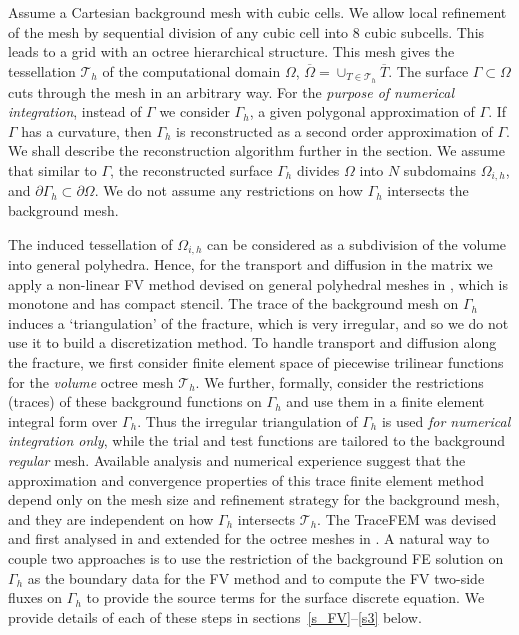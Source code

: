 \documentclass{article}
\newcommand{\rev}[1]{\textcolor{black}{{#1}}}
\newcommand{\T}{\mathcal T}
\def\dO{{\partial\Omega} }
\def\dG{{\partial\Gamma} }
\begin{document}
Assume a Cartesian background mesh with cubic cells. We allow local refinement of the mesh by sequential division
of any cubic cell into 8 cubic subcells. This leads to a grid with an octree hierarchical  structure. This mesh gives the tessellation   $\T_h$ of the computational domain $\Omega$, $\overline{\Omega}=\cup_{T\in\T_h} \overline{T}$.
The surface  $\Gamma\subset\Omega$ cuts through the mesh in an arbitrary way. For the \textit{purpose of numerical integration},
instead of $\Gamma$ we consider $\Gamma_h$, a given polygonal approximation of $\Gamma$. If $\Gamma$ has a curvature, then $\Gamma_h$ is reconstructed as a second order approximation of $\Gamma$. We shall describe the reconstruction algorithm further in the section. We assume that similar to $\Gamma$, the reconstructed surface $\Gamma_h$ divides $\Omega$ into $N$ subdomains $\Omega_{i,h}$, and $\dG_h\subset\dO$. We do not {assume} any restrictions on how $\Gamma_h$ intersects the background mesh.

The induced tessellation of  $\Omega_{i,h}$ can be considered as a subdivision of the volume into general polyhedra.
Hence, for the transport and diffusion in the matrix we apply  a non-linear FV method devised on general polyhedral meshes in \cite{Lipnikov:12,ChernyshenkoFV7:14}, which is monotone and has compact stencil. The trace of the background mesh on $\Gamma_h$ induces {a} `triangulation' of the fracture, which is very irregular, and so we do not use it \rev{to} build a discretization method.
To handle transport and diffusion along the fracture, we first consider finite element space of piecewise trilinear functions
for the \textit{volume} octree mesh $\T_h$. We further, formally, consider the restrictions (traces) of these background functions on $\Gamma_h$ and use them in a finite element integral  form over $\Gamma_h$.
Thus the irregular triangulation of $\Gamma_h$ is used \textit{for numerical integration only}, while the trial and test functions are tailored to the background \textit{regular} mesh. {Available analysis and numerical experience suggest} that the {approximation and convergence} properties of this trace finite element method
{depend only on the mesh size and refinement strategy for}  the background mesh, and they are independent on how $\Gamma_h$ intersects $\T_h$. The TraceFEM was devised and first analysed in \cite{ORG09} and extended for the octree meshes in \cite{chernyshenko2015adaptive}.  A natural way to couple two approaches is to use the
restriction of the background FE solution on $\Gamma_h$ as the boundary data for the FV method and to compute the FV two-side fluxes on $\Gamma_h$ to provide the source terms for the surface discrete equation. We provide details of each of these steps in sections~\ref{s_FV}--\ref{s3} below.
\end{document}
